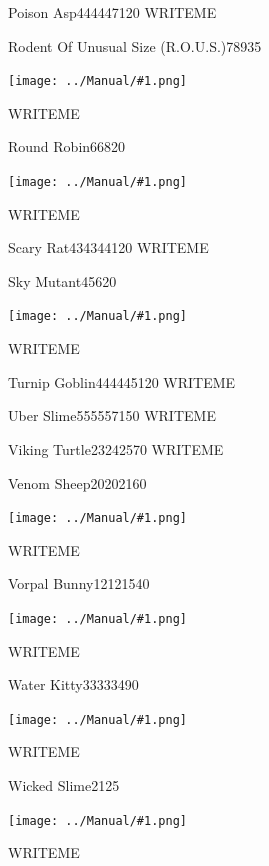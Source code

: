 \documentclass[10pt,twocolumn]{memoir}
\newcommand\pic[1]{%
  \begin{center}
    \texttt{[image: ../Manual/\#1.png]}
  \end{center}}
\begin{document}
\begin{monsterpage}{Poison Asp}{44}{44}{47}{120}
  WRITEME
\end{monsterpage}

\begin{monsterpage}{Rodent Of Unusual Size (R.O.U.S.)}{7}{8}{9}{35}
  \pic{R.O.U.S.}
  
  WRITEME
\end{monsterpage}

\begin{monsterpage}{Round Robin}{6}{6}{8}{20}
  \pic{Round-Robin}
  
  WRITEME
\end{monsterpage}

\begin{monsterpage}{Scary Rat}{43}{43}{44}{120}
  WRITEME
\end{monsterpage}

\begin{monsterpage}{Sky Mutant}{4}{5}{6}{20}
  \pic{Sky-Mutant}
  
  WRITEME
\end{monsterpage}

\begin{monsterpage}{Turnip Goblin}{44}{44}{45}{120}
  WRITEME
\end{monsterpage}

\begin{monsterpage}{Uber Slime}{55}{55}{57}{150}
  WRITEME
\end{monsterpage}

\begin{monsterpage}{Viking Turtle}{23}{24}{25}{70}
  WRITEME
\end{monsterpage}

\begin{monsterpage}{Venom Sheep}{20}{20}{21}{60}
  \pic{Venom-Sheep}
  
  WRITEME
\end{monsterpage}

\begin{monsterpage}{Vorpal Bunny}{12}{12}{15}{40}
  \pic{Vorpal-Bunny}
  
  WRITEME
\end{monsterpage}

\begin{monsterpage}{Water Kitty}{33}{33}{34}{90}
  \pic{Water-Kitty}
  
  WRITEME
\end{monsterpage}

\begin{monsterpage}{Wicked Slime}{2}{1}{2}{5}
  \pic{Wicked-Slime}
  
  WRITEME
\end{monsterpage}
\end{document}
